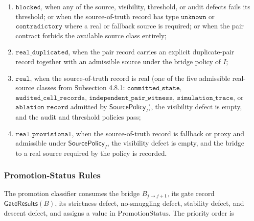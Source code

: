 \documentclass[11pt]{article}
\providecommand{\tightlist}{}
\theoremstyle{definition}
\begin{document}
\begin{enumerate}
\def\labelenumi{\arabic{enumi}.}
\tightlist
\item
  \(\texttt{blocked}\), when any of the source, visibility, threshold, or audit defects fails its threshold; or when the source-of-truth record has type \(\texttt{unknown}\) or \(\texttt{contradictory}\) where a real or fallback source is required; or when the pair contract forbids the available source class entirely;
\item
  \(\texttt{real\_duplicated}\), when the pair record carries an explicit duplicate-pair record together with an admissible source under the bridge policy of \(I\);
\item
  \(\texttt{real}\), when the source-of-truth record is real (one of the five admissible real-source classes from Subsection 4.8.1: \(\texttt{committed\_state}\), \(\texttt{audited\_cell\_records}\), \(\texttt{independent\_pair\_witness}\), \(\texttt{simulation\_trace}\), or \(\texttt{ablation\_record}\) admitted by \(\mathsf{SourcePolicy}_I\)), the visibility defect is empty, and the audit and threshold policies pass;
\item
  \(\texttt{real\_provisional}\), when the source-of-truth record is fallback or proxy and admissible under \(\mathsf{SourcePolicy}_I\), the visibility defect is empty, and the bridge to a real source required by the policy is recorded.
\end{enumerate}

\subsubsection{Promotion-Status Rules}

The promotion classifier consumes the bridge \(B_{j\to j+1}\), its gate record \(\mathsf{GateResults}(B)\), its strictness defect, no-smuggling defect, stability defect, and descent defect, and assigns a value in \(\mathrm{PromotionStatus}\). The priority order is
\end{document}
